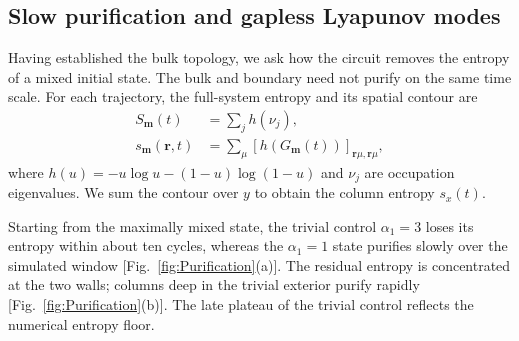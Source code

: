 \documentclass[aps,prb,10pt,twocolumn,superscriptaddress,longbibliography,floatfix]{revtex4-2}
\newcommand{\bfr}{\boldsymbol r}
\newcommand{\rec}{\mathbf m}   %
\begin{document}
{\color{blue}
\subsection{Slow purification and gapless Lyapunov modes}
\label{sec:Purification}

Having established the bulk topology, we ask how the circuit removes the entropy of a mixed initial state. The bulk and boundary need not purify on the same time scale. For each trajectory, the full-system entropy and its spatial contour are
\begin{align}
 S_{\rec}(t)&=\sum_j h(\nu_j),\nonumber\\
 s_{\rec}(\bfr,t)&=\sum_\mu[h(G_{\rec}(t))]_{\bfr\mu,\bfr\mu},
 \label{eq:BinaryEntropy}
\end{align}
where $h(u)=-u\log u-(1-u)\log(1-u)$ and $\nu_j$ are occupation eigenvalues. We sum the contour over $y$ to obtain the column entropy $s_x(t)$.

Starting from the maximally mixed state, the trivial control $\alpha_1=3$ loses its entropy within about ten cycles, whereas the $\alpha_1=1$ state purifies slowly over the simulated window [Fig.~\ref{fig:Purification}(a)]. The residual entropy is concentrated at the two walls; columns deep in the trivial exterior purify rapidly [Fig.~\ref{fig:Purification}(b)]. The late plateau of the trivial control reflects the numerical entropy floor.

}
\end{document}
